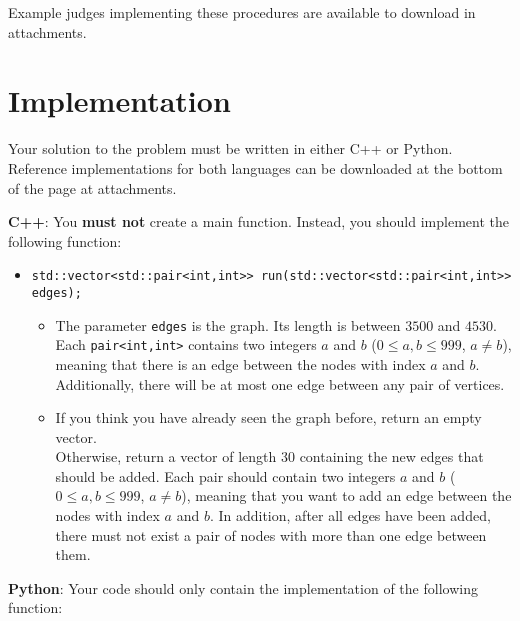 Example judges implementing these procedures are available to download in attachments.

\section*{Implementation}
Your solution to the problem must be written in either C++ or Python. Reference implementations
for both languages can be downloaded at the bottom of the page at attachments.

\textbf{C++}:
You \textbf{must not} create a main function. Instead, you should implement the following function:\\

\begin{itemize}
  \item \verb|std::vector<std::pair<int,int>> run(std::vector<std::pair<int,int>> edges);| \\
  \begin{itemize}
    \item The parameter \texttt{edges} is the graph. Its length is between $3500$ and $4530$.
    Each \verb|pair<int,int>| contains two integers $a$ and $b$ ($0 \leq a,b \leq 999$, $a \neq b$),
    meaning that there is an edge between the nodes with index $a$ and $b$. Additionally,
    there will be at most one edge between any pair of vertices.
    \item If you think you have already seen the graph before, return an empty vector.\\
    Otherwise, return a vector of length 30 containing the new edges that should be added.
    Each pair should contain two integers $a$ and $b$ ($0 \leq a,b \leq 999$, $a \neq b$),
    meaning that you want to add an edge between the nodes with index $a$ and $b$.
    In addition, after all edges have been added, there must not exist a pair of nodes with more than one edge between them.
  \end{itemize}
\end{itemize}


\textbf{Python}:
Your code should only contain the implementation of the following function:\\

